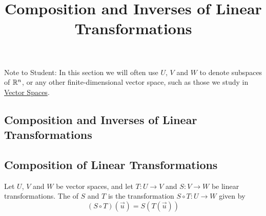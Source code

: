 \documentclass{ximera}
\title{Composition and Inverses of Linear Transformations} \license{CC BY-NC-SA 4.0}
\begin{document}
\begin{abstract}
 
\end{abstract}
\maketitle

Note to Student:  In this section we will often use $U$, $V$ and $W$ to denote subspaces of $\mathbb{R}^n$, or any other finite-dimensional vector space, such as those we study in \href{https://ximera.osu.edu/linearalgebradzv3/LinearAlgebraInteractiveIntro/XLAChapter_vecSpaces/main}{Vector Spaces}. 

\begin{onlineOnly}
\section*{Composition and Inverses of Linear Transformations}
\end{onlineOnly}

\subsection*{Composition of Linear Transformations}
\begin{definition}\label{def:compoflintrans} Let $U$, $V$ and $W$ be vector spaces, and let $T:U\rightarrow V$ and $S:V\rightarrow W$ be linear transformations.  The  of $S$ and $T$ is the transformation $S\circ T:U\rightarrow W$ given by
$$(S\circ T)(\vec{u})=S(T(\vec{u}))$$
\end{definition}
\end{document}
